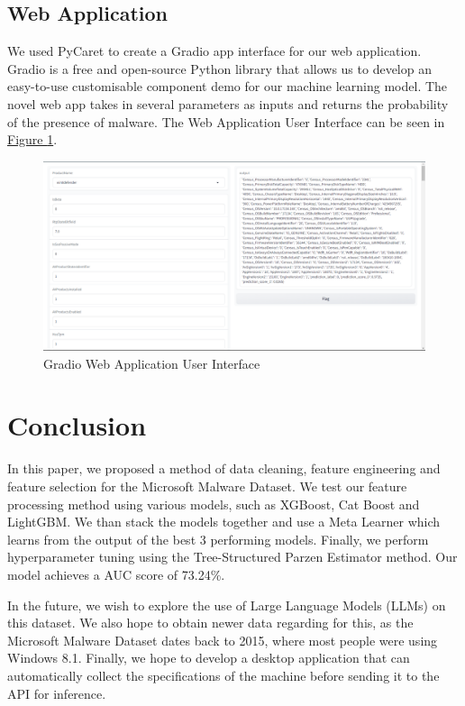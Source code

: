 \documentclass[pdflatex,sn-basic,Numbered]{sn-jnl}%
\theoremstyle{thmstyleone}%
\theoremstyle{thmstyletwo}%
\theoremstyle{thmstylethree}%
\newcommand{\reffig}[1]{\hyperref[#1]{Figure \ref*{#1}}}
\begin{document}
\subsection{Web Application}
We used PyCaret to create a Gradio \cite{gradio} app interface for our web application. Gradio is a free and open-source Python library that allows us to develop an easy-to-use customisable component demo for our machine learning model. The novel web app takes in several parameters as inputs and returns the probability of the presence of malware. The Web Application User Interface can be seen in \reffig{fig:enter-label}.
\begin{figure}
    \centering
    \includegraphics[width=\linewidth]{images/Gradio App Screenshot.png}
    \caption{Gradio Web Application User Interface}
    \label{fig:enter-label}
\end{figure}

\section{Conclusion}
In this paper, we proposed a method of data cleaning, feature engineering and feature selection for the Microsoft Malware Dataset. We test our feature processing method using various models, such as XGBoost, Cat Boost and LightGBM. We than stack the models together and use a Meta Learner which learns from the output of the best 3 performing models. Finally, we perform hyperparameter tuning using the Tree-Structured Parzen Estimator method. Our model achieves a AUC score of 73.24\%. 

In the future, we wish to explore the use of Large Language Models (LLMs) on this dataset. We also hope to obtain newer data regarding for this, as the Microsoft Malware Dataset dates back to 2015, where most people were using Windows 8.1. Finally, we hope to develop a desktop application that can automatically collect the specifications of the machine before sending it to the API for inference. 


% 

\end{document}
